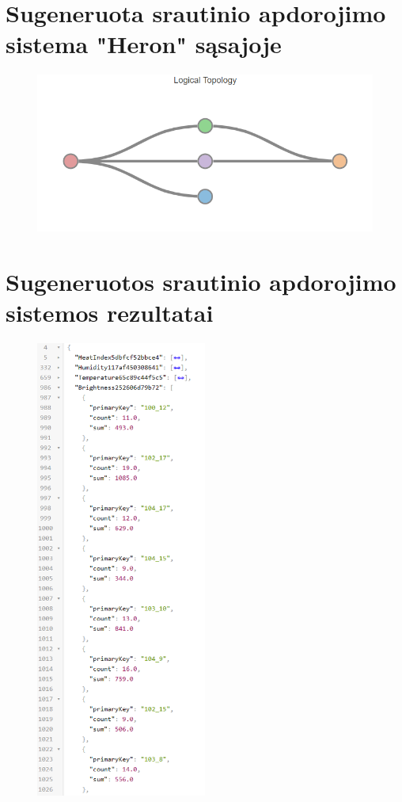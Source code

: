 \documentclass{VUMIFPSbakalaurinis}
\begin{document}
\section{Sugeneruota srautinio apdorojimo sistema "Heron" sąsajoje}\label{add:generated-system1}
\begin{figure}[H]
    \centering
    \includegraphics[width=1\textwidth]{img/generated-topology-1.png}
    \label{img:generated-data}
\end{figure}

\section{Sugeneruotos srautinio apdorojimo sistemos rezultatai}\label{add:generated-data1}
\begin{figure}[H]
    \centering
    \includegraphics[width=0.5\textwidth]{img/topology-data-1.png}
    \label{img:generated-data}
\end{figure}
\end{document}
